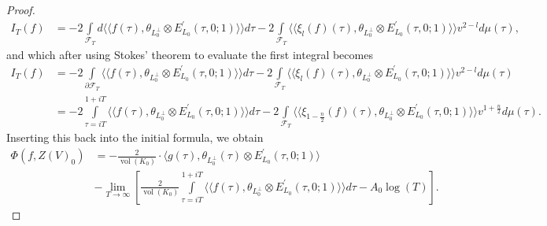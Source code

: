 \documentclass{amsart}
\theoremstyle{definition}
\theoremstyle{definition}
\theoremstyle{definition}
\begin{document}
\begin{proof}
\begin{align*} I_T(f) &= -2 \int\limits_{\mathcal{F}_T} d \langle \langle f(\tau), \theta_{L_0^{\perp}} 
\otimes E_{L_0}^{\prime}(\tau, 0; 1) \rangle \rangle d \tau 
- 2 \int\limits_{\mathcal{F}_T} \langle \langle \xi_l(f)(\tau), \theta_{L_0^{\perp}} 
\otimes E_{L_0}^{\prime}(\tau, 0; 1) \rangle \rangle v^{2-l} d \mu(\tau), \end{align*}
and which after using Stokes' theorem to evaluate the first integral becomes 
\begin{align*} I_T(f) &= -2 \int\limits_{ \partial \mathcal{F}_T} \langle \langle f(\tau), \theta_{L_0^{\perp}} 
\otimes E_{L_0}^{\prime}(\tau, 0; 1) \rangle \rangle d \tau 
- 2 \int\limits_{\mathcal{F}_T} \langle \langle \xi_l(f)(\tau), \theta_{L_0^{\perp}} 
\otimes E_{L_0}^{\prime}(\tau, 0; 1) \rangle \rangle v^{2-l} d \mu(\tau) \\ 
&= -2 \int\limits_{\tau = iT}^{1 + iT} \langle \langle f(\tau), \theta_{L_0^{\perp}} 
\otimes E_{L_0}^{\prime}(\tau, 0; 1) \rangle \rangle d \tau 
- 2 \int\limits_{\mathcal{F}_T} \langle \langle \xi_{1 - \frac{n}{2}}(f)(\tau), \theta_{L_0^{\perp}} 
\otimes E_{L_0}^{\prime}(\tau, 0; 1) \rangle \rangle v^{1 + \frac{n}{2}} d \mu(\tau). \end{align*}
Inserting this back into the initial formula, we obtain
\begin{align*} \Phi(f, Z(V)_0) 
&= - \frac{2}{\operatorname{vol}(K_0)} \cdot \langle g(\tau), \theta_{L_0^{\perp}}(\tau) \otimes E_{L_0}^{\prime}(\tau, 0; 1) \rangle \\
&- \lim_{T \rightarrow \infty} \left[ \frac{2}{\operatorname{vol}(K_0) }  \int\limits_{\tau = iT}^{1 + iT} \langle \langle f(\tau), \theta_{L_0^{\perp}} 
\otimes E_{L_0}^{\prime}(\tau, 0; 1) \rangle \rangle d \tau  - A_0 \log(T)  \right]. \end{align*} 


\end{proof}
\end{document}
